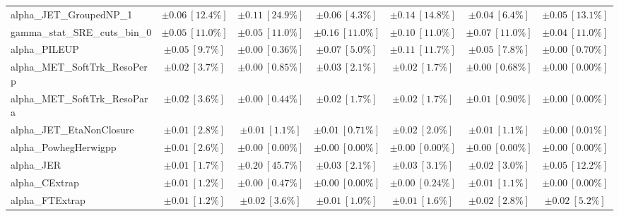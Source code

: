 \begin{sidewaystable}
\begin{center}
\begin{tabular*}{\textwidth}{@{\extracolsep{\fill}}lcccccc}
alpha\_JET\_GroupedNP\_1         & $\pm 0.06\ [12.4\%] $          & $\pm 0.11\ [24.9\%] $          & $\pm 0.06\ [4.3\%] $          & $\pm 0.14\ [14.8\%] $          & $\pm 0.04\ [6.4\%] $          & $\pm 0.05\ [13.1\%] $       \\
gamma\_stat\_SRE\_cuts\_bin\_0         & $\pm 0.05\ [11.0\%] $          & $\pm 0.05\ [11.0\%] $          & $\pm 0.16\ [11.0\%] $          & $\pm 0.10\ [11.0\%] $          & $\pm 0.07\ [11.0\%] $          & $\pm 0.04\ [11.0\%] $       \\
alpha\_PILEUP         & $\pm 0.05\ [9.7\%] $          & $\pm 0.00\ [0.36\%] $          & $\pm 0.07\ [5.0\%] $          & $\pm 0.11\ [11.7\%] $          & $\pm 0.05\ [7.8\%] $          & $\pm 0.00\ [0.70\%] $       \\
alpha\_MET\_SoftTrk\_ResoPerp         & $\pm 0.02\ [3.7\%] $          & $\pm 0.00\ [0.85\%] $          & $\pm 0.03\ [2.1\%] $          & $\pm 0.02\ [1.7\%] $          & $\pm 0.00\ [0.68\%] $          & $\pm 0.00\ [0.00\%] $       \\
alpha\_MET\_SoftTrk\_ResoPara         & $\pm 0.02\ [3.6\%] $          & $\pm 0.00\ [0.44\%] $          & $\pm 0.02\ [1.7\%] $          & $\pm 0.02\ [1.7\%] $          & $\pm 0.01\ [0.90\%] $          & $\pm 0.00\ [0.00\%] $       \\
alpha\_JET\_EtaNonClosure         & $\pm 0.01\ [2.8\%] $          & $\pm 0.01\ [1.1\%] $          & $\pm 0.01\ [0.71\%] $          & $\pm 0.02\ [2.0\%] $          & $\pm 0.01\ [1.1\%] $          & $\pm 0.00\ [0.01\%] $       \\
alpha\_PowhegHerwigpp         & $\pm 0.01\ [2.6\%] $          & $\pm 0.00\ [0.00\%] $          & $\pm 0.00\ [0.00\%] $          & $\pm 0.00\ [0.00\%] $          & $\pm 0.00\ [0.00\%] $          & $\pm 0.00\ [0.00\%] $       \\
alpha\_JER         & $\pm 0.01\ [1.7\%] $          & $\pm 0.20\ [45.7\%] $          & $\pm 0.03\ [2.1\%] $          & $\pm 0.03\ [3.1\%] $          & $\pm 0.02\ [3.0\%] $          & $\pm 0.05\ [12.2\%] $       \\
alpha\_CExtrap         & $\pm 0.01\ [1.2\%] $          & $\pm 0.00\ [0.47\%] $          & $\pm 0.00\ [0.00\%] $          & $\pm 0.00\ [0.24\%] $          & $\pm 0.01\ [1.1\%] $          & $\pm 0.00\ [0.00\%] $       \\
alpha\_FTExtrap         & $\pm 0.01\ [1.2\%] $          & $\pm 0.02\ [3.6\%] $          & $\pm 0.01\ [1.0\%] $          & $\pm 0.01\ [1.6\%] $          & $\pm 0.02\ [2.8\%] $          & $\pm 0.02\ [5.2\%] $       \\

\end{tabular*}
\end{center}
\end{sidewaystable}
